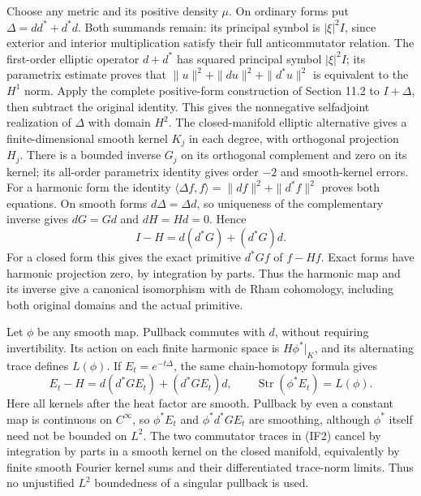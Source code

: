 \documentclass[
  11pt,
]{article}
\begin{document}
Choose any metric and its positive density \(\mu\). On ordinary forms
put \(\Delta=dd^*+d^*d\). Both summands remain: its principal symbol is
\(|\xi|^2I\), since exterior and interior multiplication satisfy their
full anticommutator relation. The first-order elliptic operator
\(d+d^*\) has squared principal symbol \(|\xi|^2I\); its parametrix
estimate proves that \(\|u\|^2+\|du\|^2+\|d^*u\|^2\) is equivalent to
the \(H^1\) norm. Apply the complete positive-form construction of
Section 11.2 to \(I+\Delta\), then subtract the original identity. This
gives the nonnegative selfadjoint realization of \(\Delta\) with domain
\(H^2\). The closed-manifold elliptic alternative gives a
finite-dimensional smooth kernel \(K_j\) in each degree, with orthogonal
projection \(H_j\). There is a bounded inverse \(G_j\) on its orthogonal
complement and zero on its kernel; its all-order parametrix identity
gives order \(-2\) and smooth-kernel errors. For a harmonic form the
identity \(\langle\Delta f,f\rangle=\|df\|^2+\|d^*f\|^2\) proves both
equations. On smooth forms \(d\Delta=\Delta d\), so uniqueness of the
complementary inverse gives \(dG=Gd\) and \(dH=Hd=0\). Hence \[
 I-H=d(d^*G)+(d^*G)d.
\tag{IF1}
\] For a closed form this gives the exact primitive \(d^*Gf\) of
\(f-Hf\). Exact forms have harmonic projection zero, by integration by
parts. Thus the harmonic map and its inverse give a canonical
isomorphism with de Rham cohomology, including both original domains and
the actual primitive.

Let \(\phi\) be any smooth map. Pullback commutes with \(d\), without
requiring invertibility. Its action on each finite harmonic space is
\(H\phi^*|_K\), and its alternating trace defines \(L(\phi)\). If
\(E_t=e^{-t\Delta}\), the same chain-homotopy formula gives \[
 E_t-H=d(d^*GE_t)+(d^*GE_t)d,\qquad
 \operatorname{Str}(\phi^*E_t)=L(\phi).
\tag{IF2}
\] Here all kernels after the heat factor are smooth. Pullback by even a
constant map is continuous on \(C^\infty\), so \(\phi^*E_t\) and
\(\phi^*d^*GE_t\) are smoothing, although \(\phi^*\) itself need not be
bounded on \(L^2\). The two commutator traces in (IF2) cancel by
integration by parts in a smooth kernel on the closed manifold,
equivalently by finite smooth Fourier kernel sums and their
differentiated trace-norm limits. Thus no unjustified \(L^2\)
boundedness of a singular pullback is used.
\end{document}
